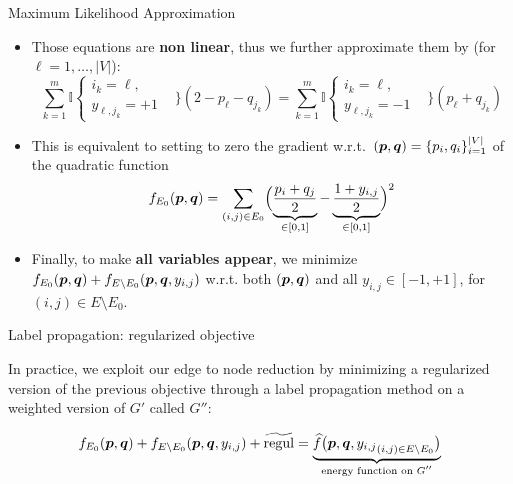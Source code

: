 \documentclass[10pt,svgnames,ignorenonframetext,final]{beamer}
\providecommand{\largelist}{%
  \setlength{\itemsep}{8pt}\setlength{\parskip}{3pt}}
\begin{document}
\begin{frame}{Maximum Likelihood Approximation}

  \begin{itemize}[<+->]
    \largelist
  \item
    Those equations are \textbf{non linear}, thus we
further approximate them by (for $\ell = 1, \ldots, |V|$):
\vspace{-6pt}
\begin{equation*}\label{e:slp}
  \sum_{k=1}^m \mathbb{I}\begin{cases}
    i_k = \ell, &\\
    y_{\ell,j_k}=+1 &
  \end{cases}
    \Biggr\}
\left(2-p_{\ell}-q_{j_k}\right)
=
\sum_{k=1}^m \mathbb{I}\begin{cases}
  i_k = \ell, &\\
  y_{\ell,j_k}=-1 &
\end{cases}
    \Biggr\}
\left(p_{\ell}+q_{j_k}\right)
\end{equation*}

  \item
This is equivalent to setting to zero the gradient
w.r.t.~\((\boldsymbol{p},\boldsymbol{q}) =\{p_i, q_i\}_{i=1}^{|V|}\) of the quadratic function
\[f_{E_0}(\boldsymbol{p},\boldsymbol{q}) = \sum_{(i,j) \in E_0} \Bigl(\underbrace{\frac{p_i+q_j}{2}}_{\in [0,1]} -
\underbrace{\frac{1+y_{i,j}}{2}}_{\in [0,1]} \Bigr)^2\]

  \item Finally, to make \textbf{all variables appear}, we minimize \alert{\(f_{E_0}(\boldsymbol{p},\boldsymbol{q}) + f_{E\setminus
    E_0}(\boldsymbol{p},\boldsymbol{q}, {y_{i,j}})\)} w.r.t. both \((\boldsymbol{p},\boldsymbol{q})\) and all \(y_{i,j} \in [-1,+1]\), for \((i,j)\in
E\setminus E_0\).

\end{itemize}

\end{frame}

\begin{frame}{Label propagation: regularized objective}

In practice, we exploit our edge to node reduction by \alert{minimizing a
regularized version} of the previous objective through a \alert{label
propagation method on a weighted version of \(G'\)} called \(G''\):

\begin{equation*}
  f_{E_0}(\boldsymbol{p},\boldsymbol{q}) + f_{E\setminus E_0}(\boldsymbol{p},\boldsymbol{q}, {y_{i,j}}) + \widetilde{\mathrm{regul}} = 
  \underbrace{ \widehat{f}\big(\boldsymbol{p},\boldsymbol{q},{y_{i,j}}_{(i,j) \in E\setminus E_0}\big)}_{\text{energy
  function on $G''$}}
\end{equation*}

\end{frame}
\end{document}
